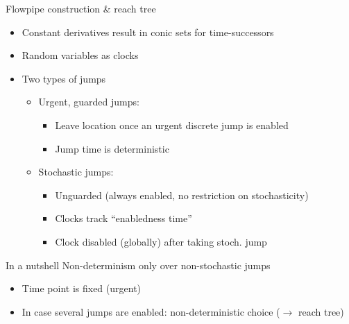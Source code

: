 \documentclass[aspectratio=169]{beamer}
\begin{document}
\begin{frame}{Flowpipe construction \& reach tree}

  \begin{minipage}{.7\linewidth}
    \begin{itemize}
      \item Constant derivatives result in conic sets for time-successors
      \item Random variables as clocks
      \item Two types of jumps
      \begin{itemize}
        \item Urgent, guarded jumps:
          \begin{itemize}
            \item Leave location once an urgent discrete jump is enabled
            \item Jump time is deterministic
          \end{itemize}
          \item Stochastic jumps:
          \begin{itemize}
            \item Unguarded (always enabled, no restriction on stochasticity)
            \item Clocks track \enquote{enabledness time}
            \item Clock disabled (globally) after taking stoch. jump
          \end{itemize}
      \end{itemize}
    \end{itemize}
  \end{minipage}%
  \begin{minipage}{.3\linewidth}
      
  \end{minipage}

  \begin{result}{In a nutshell}
    Non-determinism only over non-stochastic jumps
    \begin{itemize}
      \item Time point is fixed (urgent)
      \item In case several jumps are enabled: non-deterministic choice ($\rightarrow$ reach tree)
    \end{itemize}
  \end{result}

\end{frame}

\end{document}

